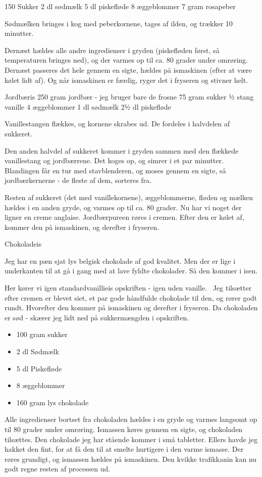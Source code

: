 \documentclass[
]{book}
\providecommand{\tightlist}{%
  \setlength{\itemsep}{0pt}\setlength{\parskip}{0pt}}
\begin{document}
150 Sukker
2 dl sødmælk
5 dl piskefløde
8 æggeblommer
7 gram rosapeber

Sødmælken bringes i kog med peberkornene, tages af ilden, og trækker 10 minutter.

Dernæst hældes alle andre ingredienser i gryden (piskefløden først, så temperaturen bringes ned), og der varmes op til ca. 80 grader under omrøring. Dernæst passeres det hele gennem en sigte, hældes på ismaskinen (efter at være kølet lidt af). Og når ismaskinen er færdig, ryger det i fryseren og stivner helt.

Jordbæris
250 gram jordbær - jeg bruger bare de frosne
75 gram sukker
½ stang vanille
4 æggeblommer
1 dl sødmælk
2½ dl piskefløde

Vanillestangen flækkes, og kornene skrabes ud. De fordeles i halvdelen af sukkeret.

Den anden halvdel af sukkeret kommer i gryden sammen med den flækkede vanillestang og jordbærrene. Det koges op, og simrer i et par minutter. Blandingen får en tur med stavblenderen, og moses gennem en sigte, så jordbærkernerne - de fleste af dem, sorteres fra.

Resten af sukkeret (det med vanillekornene), æggeblommerne, fløden og mælken hældes i en anden gryde, og varmes op til ca. 80 grader. Nu har vi noget der ligner en creme anglaise. Jordbærpureen røres i cremen. Efter den er kølet af, kommer den på ismaskinen, og derefter i fryseren.

Chokoladeis

Jeg har en pæn sjat lys belgisk chokolade af god kvalitet. Men der er lige i underkanten til at gå i gang med at lave fyldte chokolader. Så den kommer i isen.

Her kører vi igen standardvanillieis opskriften - igen uden vanille.~ Jeg tilsætter efter cremen er blevet siet, et par gode håndfulde chokolade til den, og rører godt rundt. Hvorefter den kommer på ismaskinen og derefter i fryseren. Da chokoladen er sød - skærer jeg lidt ned på sukkermængden i opskriften.

\begin{itemize}
\tightlist
\item
  100 gram sukker
\item
  2 dl Sødmælk
\item
  5 dl Piskefløde
\item
  8 æggeblommer
\item
  160 gram lys chokolade
\end{itemize}

Alle ingredienser bortset fra chokoladen hældes i en gryde og varmes langsomt op til 80 grader under omrøring. Ismassen køres gennem en sigte, og chokoladen tilsættes. Den chokolade jeg har stående kommer i små tabletter. Ellers havde jeg hakket den fint, for at få den til at smelte hurtigere i den varme ismasse. Der røres grundigt, og ismassen hældes på ismaskinen. Den kvikke trafikkanin kan nu godt regne resten af processen ud.
\end{document}
